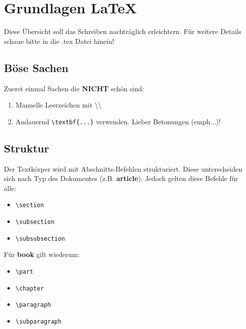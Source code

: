 \documentclass[10pt]{article}  %
\begin{document}
    \section{Grundlagen \LaTeX} 
    Diese Übersicht soll das Schreiben nachträglich erleichtern. Für weitere Details schaue bitte in die .tex Datei hinein!

    \subsection{Böse Sachen}
        Zuerst einmal Sachen die \textbf{NICHT} schön sind:
        \begin{enumerate}
            \item Manuelle Leerzeichen mit \textbackslash \textbackslash
            \item Andauernd \verb!\textbf{...}! verwenden. Lieber Betonungen (emph...)!
        \end{enumerate} 
    
    \subsection{Struktur}
        Der Textkörper wird mit Abschnitts-Befehlen strukturiert. Diese unterscheiden sich nach Typ des Dokumentes (z.B. \textbf{article}). Jedoch gelten diese Befehle für alle:
        \begin{itemize}
            \item \verb!\section!
            \item \verb!\subsection!
            \item \verb!\subsubsection!
        \end{itemize}
        Für \textbf{book} gilt wiederum:
        \begin{itemize}
            \item \verb!\part!
            \item \verb!\chapter!
            \item \verb!\paragraph!
            \item \verb!\subparagraph!
        \end{itemize}
\end{document}
